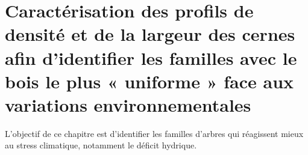 \documentclass{report}
\newcommand{\Ctreize}{$\delta$\textsuperscript{13}C\xspace}
\begin{document}
\begin{itemize}
	
	
	 

	
\end{itemize} 


\chapter{Caractérisation des profils de densité et de la largeur des cernes afin d'identifier les familles avec le bois le plus « uniforme » face aux variations environnementales}


L'objectif de ce chapitre est d'identifier les familles d'arbres qui réagissent mieux au stress climatique, notamment le déficit hydrique.

\end{document}
